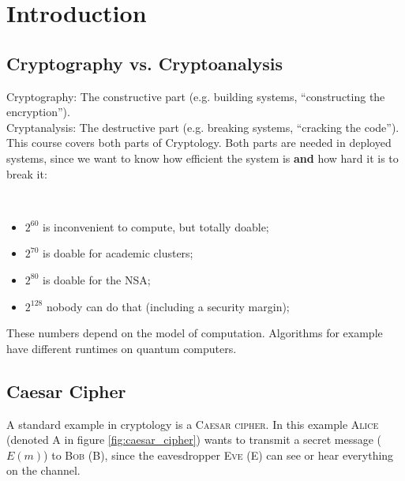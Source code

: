 \chapter{Introduction}

\section{Cryptography vs. Cryptoanalysis}

Cryptography: The constructive part (e.g. building systems, ``constructing the encryption''). \\
Cryptanalysis: The destructive part (e.g. breaking systems, ``cracking the code''). \\

This course covers both parts of Cryptology. Both parts are needed in deployed systems, since we want to know how efficient the system is \textbf{and} how hard it is to break it:

\begin{example}
\ \\
\begin{itemize}
\item $2^{60}$ is inconvenient to compute, but totally doable;
\item $2^{70}$ is doable for academic clusters;
\item $2^{80}$ is doable for the NSA;
\item $2^{128}$ nobody can do that (including a security margin);
\end{itemize}
\end{example}

\begin{remark}
These numbers depend on the model of computation. Algorithms for example have different runtimes on quantum computers.
\end{remark}


\section{Caesar Cipher}

A standard example in cryptology is a \textsc{Caesar cipher}. In this example \textsc{Alice} (denoted \textsc{A} in figure \ref{fig:caesar_cipher}) wants to transmit a secret message ($E(m)$) to \textsc{Bob} (\textsc{B}), since the eavesdropper \textsc{Eve} (\textsc{E}) can see or hear everything on the channel.

